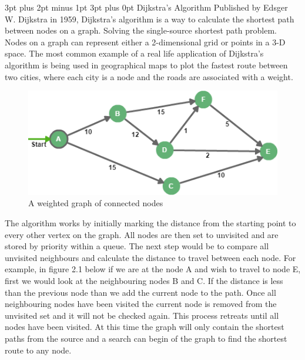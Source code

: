 \documentclass[12pt,a4paper,oneside]{book}
\makeatletter
\renewcommand\subsection{\@startsection {subsection}{1}{2mm} %
                               {3pt plus 2pt minus 1pt} %
                               {3pt plus 0pt} %
                               {\normalfont\bfseries}}
\makeatother
\begin{document}
\subsection{Dijkstra’s Algorithm}
Published by Edsger W. Dijkstra in 1959, Dijkstra’s algorithm is a way to calculate the shortest path between nodes on a graph. Solving the single-source shortest path problem. Nodes on a graph can represent either a 2-dimensional grid or points in a 3-D space. The most common example of a real life application of Dijkstra’s algorithm is being used in geographical maps to plot the fastest route between two cities, where each city is a node and the roads are associated with a weight. 
\vspace{2mm} 
\newline
\begin{figure}
	\includegraphics[width=\linewidth]{images/Dijsk.png}
	\caption{A weighted graph of connected nodes}
\end{figure}
The algorithm works by initially marking the distance from the starting point to every other vertex on the graph. All nodes are then set to unvisited and are stored  by priority within a queue. The next step would be to compare all unvisited neighbours and calculate the distance to travel between each node. For example, in figure 2.1 below if we are at the node A and wish to travel to node E, first we would look at the neighbouring nodes B and C. If the distance is less than the previous node than we add the current node to the path. Once all neighbouring nodes have been visited the current node is removed from the unvisited set and it will not be checked again. This process retreats until all nodes have been visited. At this time the graph will only contain the shortest paths from the source and a search can begin of the graph to find the shortest route to any node.
\end{document}
